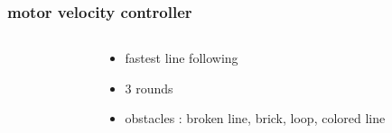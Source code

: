 \documentclass{beamer}
\begin{document}
\begin{frame}
  
  \frametitle{\textbf { motor velocity controller}}
  
  \begin{columns}

    \begin{column}{0.5\textwidth}
    \end{column}

    \begin{column}{0.5\textwidth}
      \begin{itemize}
        \item fastest line following
        \item 3 rounds
        \item obstacles : broken line, brick, loop, colored line
      \end{itemize}
    \end{column}

  \end{columns}
  
\end{frame}
\end{document}
